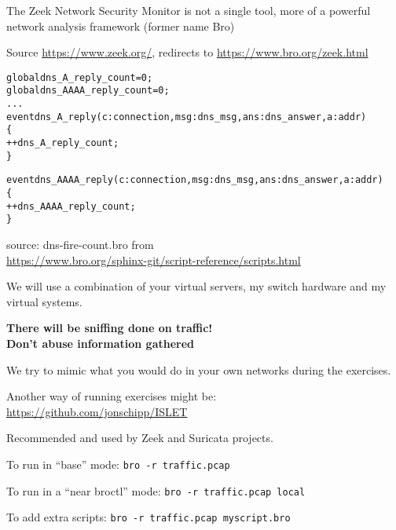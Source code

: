 \documentclass[20pt,landscape,a4paper,footrule]{foils}
\begin{document}


The Zeek Network Security Monitor is not a single tool, more of a
powerful network analysis framework (former name Bro)

{\small Source \url{https://www.zeek.org/}, redirects to \url{https://www.bro.org/zeek.html}}


\begin{alltt}\small
global dns_A_reply_count=0;
global dns_AAAA_reply_count=0;
...
event dns_A_reply(c: connection, msg: dns_msg, ans: dns_answer, a: addr)
        \{
        ++dns_A_reply_count;
        \}

event dns_AAAA_reply(c: connection, msg: dns_msg, ans: dns_answer, a: addr)
        \{
        ++dns_AAAA_reply_count;
        \}
\end{alltt}

source: dns-fire-count.bro from\\
{\small {}
\url{https://www.bro.org/sphinx-git/script-reference/scripts.html}}




We will use a combination of your virtual servers, my switch hardware and my virtual systems.

\vskip 1cm
{\Large \bf There will be sniffing done on traffic!\\
Don't abuse information gathered}

We try to mimic what you would do in your own networks during the exercises.

Another way of running exercises might be:\\
\url{https://github.com/jonschipp/ISLET}

Recommended and used by Zeek and Suricata projects.


\begin{list1}
\item To run in “base” mode:
 \verb+bro -r traffic.pcap+
\item To run in a “near broctl” mode:
\verb+bro -r traffic.pcap local+
\item To add extra scripts:
\verb+bro -r traffic.pcap myscript.bro+
\end{list1}
\end{document}
